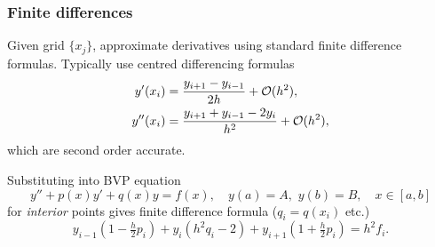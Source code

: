 \documentclass{beamer}
\begin{document}
\begin{frame}
  \frametitle{Finite differences}

  Given grid $\{x_j\}$, approximate derivatives using standard finite
  difference formulas. \pause Typically use centred differencing
  formulas
  \begin{align*}
    y' (x_i) & = \frac{y_{i+1} - y_{i-1}}{2 h} + {\cal O} (h^2), \\
    y'' (x_i) & = \frac{y_{i+1} + y_{i-1} - 2 y_i}{h^2} + {\cal O} (h^2),
  \end{align*}
  which are second order accurate. \pause

  \vspace{1ex}

  Substituting into BVP equation
  \begin{equation*}
    y'' + p(x) y' + q(x) y =  f(x), \quad y(a) = A, \,\, y(b) = B,
    \quad x \in [a,b]
  \end{equation*}
  for \emph{interior} points gives finite difference formula ($q_i =
  q(x_i)$ etc.)
  \begin{equation*}
    y_{i-1} \left( 1 - \tfrac{h}{2} p_i \right) +  y_{i} \left( h^2
      q_i - 2 \right) + y_{i+1} \left( 1 + \tfrac{h}{2} p_i \right) =
    h^2 f_i.
  \end{equation*}

\end{frame}
\end{document}
